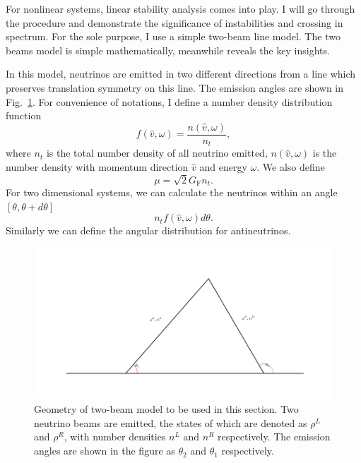 For nonlinear systems, linear stability analysis comes into play. I will go through the procedure and demonstrate the significance of instabilities and crossing in spectrum. For the sole purpose, I use a simple two-beam line model. The two beams model is simple mathematically, meanwhile reveals the key insights.

In this model, neutrinos are emitted in two different directions from a line which preserves translation symmetry on this line. The emission angles are shown in Fig.~\ref{chap:collective-sec:two-beams-fig:two-beam-line-model}. For convenience of notations, I define a number density distribution function
\begin{equation}
   f(\hat v,\omega)= \frac{n(\hat v,\omega)}{n_t},
\end{equation}
where $n_t$ is the total number density of all neutrino emitted, $n(\hat v,\omega)$ is the number density with momentum direction $\hat v$ and energy $\omega$.
We also define
\begin{equation}
   \mu = \sqrt{2}G_{\mathrm F} n_t.
\end{equation}
For two dimensional systems, we can calculate the neutrinos within an angle $[\theta,\theta+d\theta]$
\begin{equation}
   n_t f(\hat v,\omega) d\theta.
\end{equation}
Similarly we can define the angular distribution for antineutrinos.


\begin{figure}[!htbp]
    \centering
    \includegraphics[width=\textwidth]{chapters/assets/dr/two-beam-line-model.png}
    \caption{Geometry of two-beam model to be used in this section. Two neutrino beams are emitted, the states of which are denoted as $\rho^L$ and $\rho^R$, with number densities $n^L$ and $n^R$ respectively. The emission angles are shown in the figure as $\theta_2$ and $\theta_1$ respectively. }
    \label{chap:collective-sec:two-beams-fig:two-beam-line-model}
\end{figure}



